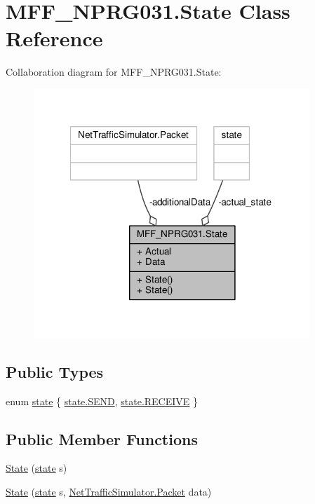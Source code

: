 \hypertarget{classMFF__NPRG031_1_1State}{\section{M\-F\-F\-\_\-\-N\-P\-R\-G031.\-State Class Reference}
\label{classMFF__NPRG031_1_1State}
}


Collaboration diagram for M\-F\-F\-\_\-\-N\-P\-R\-G031.\-State\-:\nopagebreak
\begin{figure}[H]
\begin{center}
\leavevmode
\includegraphics[width=295pt]{classMFF__NPRG031_1_1State__coll__graph}
\end{center}
\end{figure}
\subsection*{Public Types}
\begin{DoxyCompactItemize}
\item 
enum \hyperlink{classMFF__NPRG031_1_1State_a66bf64f065cb036d2652b0f69b0c5e10}{state} \{ \hyperlink{classMFF__NPRG031_1_1State_a66bf64f065cb036d2652b0f69b0c5e10a548e51fa67d541384e9585adf0db95dc}{state.\-S\-E\-N\-D}, 
\hyperlink{classMFF__NPRG031_1_1State_a66bf64f065cb036d2652b0f69b0c5e10a42ddaaef1ffd16ad35901150add8f8f2}{state.\-R\-E\-C\-E\-I\-V\-E}
 \}
\end{DoxyCompactItemize}
\subsection*{Public Member Functions}
\begin{DoxyCompactItemize}
\item 
\hyperlink{classMFF__NPRG031_1_1State_a61a59b7f5d1300296e82bb77c858a288}{State} (\hyperlink{classMFF__NPRG031_1_1State_a66bf64f065cb036d2652b0f69b0c5e10}{state} s)
\item 
\hyperlink{classMFF__NPRG031_1_1State_adde0dcaa74895221c6ed5184095e6e58}{State} (\hyperlink{classMFF__NPRG031_1_1State_a66bf64f065cb036d2652b0f69b0c5e10}{state} s, \hyperlink{classNetTrafficSimulator_1_1Packet}{Net\-Traffic\-Simulator.\-Packet} data)
\end{DoxyCompactItemize}
